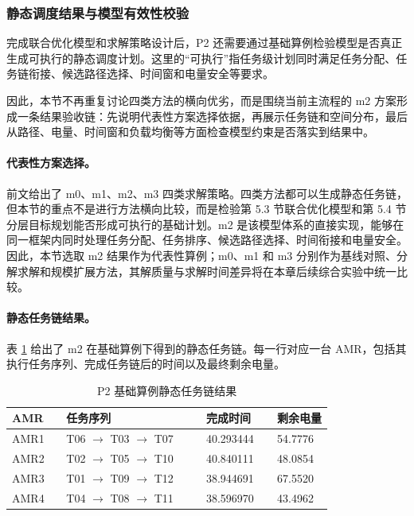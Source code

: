 \subsubsection{静态调度结果与模型有效性校验}

完成联合优化模型和求解策略设计后，P2 还需要通过基础算例检验模型是否真正生成可执行的静态调度计划。这里的“可执行”指任务级计划同时满足任务分配、任务链衔接、候选路径选择、时间窗和电量安全等要求。

因此，本节不再重复讨论四类方法的横向优劣，而是围绕当前主流程的 m2 方案形成一条结果验收链：先说明代表性方案选择依据，再展示任务链和空间分布，最后从路径、电量、时间窗和负载均衡等方面检查模型约束是否落实到结果中。

\paragraph{代表性方案选择。}
前文给出了 m0、m1、m2、m3 四类求解策略。四类方法都可以生成静态任务链，但本节的重点不是进行方法横向比较，而是检验第 5.3 节联合优化模型和第 5.4 节分层目标规划能否形成可执行的基础计划。m2 是该模型体系的直接实现，能够在同一框架内同时处理任务分配、任务排序、候选路径选择、时间衔接和电量安全。因此，本节选取 m2 结果作为代表性算例；m0、m1 和 m3 分别作为基线对照、分解求解和规模扩展方法，其解质量与求解时间差异将在本章后续综合实验中统一比较。

\paragraph{静态任务链结果。}
表 \ref{tab:p2-static-sequence} 给出了 m2 在基础算例下得到的静态任务链。每一行对应一台 AMR，包括其执行任务序列、完成任务链后的时间以及最终剩余电量。

\begin{table}[!htbp]
\centering
\small
\begin{tabular}{p{0.14\linewidth}p{0.36\linewidth}p{0.18\linewidth}p{0.12\linewidth}}
\toprule
AMR & 任务序列 & 完成时间 & 剩余电量 \\
\midrule
AMR1 & T06 $\rightarrow$ T03 $\rightarrow$ T07 & 40.293444 & 54.7776 \\
AMR2 & T02 $\rightarrow$ T05 $\rightarrow$ T10 & 40.840111 & 48.0854 \\
AMR3 & T01 $\rightarrow$ T09 $\rightarrow$ T12 & 38.944691 & 67.5520 \\
AMR4 & T04 $\rightarrow$ T08 $\rightarrow$ T11 & 38.596970 & 43.4962 \\
\bottomrule
\end{tabular}
\caption{P2 基础算例静态任务链结果}
\label{tab:p2-static-sequence}
\end{table}

